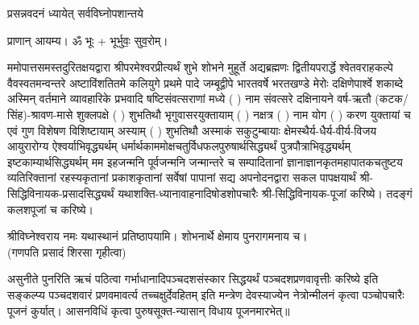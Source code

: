 
\setlength{\parindent}{0pt}




{प्रसन्नवदनं ध्यायेत् सर्वविघ्नोपशान्तये}

प्राणान्  आयम्य।  ॐ भूः + भूर्भुवः॒ सुव॒रोम्।


ममोपात्तसमस्तदुरितक्षयद्वारा श्रीपरमेश्वरप्रीत्यर्थं शुभे शोभने मुहूर्ते अद्यब्रह्मणः
द्वितीयपरार्द्धे श्वेतवराहकल्पे वैवस्वतमन्वन्तरे अष्टाविंशतितमे कलियुगे प्रथमे पादे
जम्बूद्वीपे भारतवर्षे भरतखण्डे मेरोः दक्षिणेपार्श्वे शकाब्दे अस्मिन् वर्तमाने व्यावहारिके
प्रभवादि षष्टिसंवत्सराणां मध्ये (  ) नाम संवत्सरे दक्षिनायने 
वर्ष-ऋतौ (कटक/सिंह)-श्रावण-मासे शुक्लपक्षे ( ) शुभतिथौ भृगुवासरयुक्तायाम्
(  ) नक्षत्र (  ) नाम  योग  ( ) करण युक्तायां च एवं गुण विशेषण विशिष्टायाम्
अस्याम् ( ) शुभतिथौ 
अस्माकं सकुटुम्बायाः क्षेमस्थैर्य-धैर्य-वीर्य-विजय आयुरारोग्य ऐश्वर्याभिवृद्ध्यर्थम्
धर्मार्थकाममोक्ष\-चतुर्विधफलपुरुषार्थसिद्ध्यर्थं पुत्रपौत्राभि\-वृद्ध्यर्थम् इष्टकाम्यार्थसिद्ध्यर्थम्
मम इहजन्मनि पूर्वजन्मनि जन्मान्तरे च सम्पादितानां ज्ञानाज्ञानकृतमहा\-पातकचतुष्टय
व्यतिरिक्तानां रहस्यकृतानां प्रकाशकृतानां सर्वेषां पापानां सद्य अपनोदनद्वारा सकल 
पापक्षयार्थं श्री-सिद्धिविनायक-प्रसादसिद्ध्यर्थं 
यथाशक्ति-ध्यानावाहनादिषोडशोपचारैः श्री-सिद्धिविनायक-पूजां करिष्ये। तदङ्गं कलशपूजां च करिष्ये। 

श्रीविघ्नेश्वराय नमः यथास्थानं प्रतिष्ठापयामि। शोभनार्थे क्षेमाय पुनरागमनाय च।\\
(गणपति प्रसादं शिरसा गृहीत्वा)














असुनीते पुनरिति ऋचं पठित्वा गर्भाधानादिपञ्चदशसंस्कार सिद्धयर्थं पञ्चदशप्रणवावृत्तीः करिष्ये इति सङ्कल्प्य पञ्चदशवारं प्रणवमावर्त्य तच्चक्षुर्देवहितम् इति मन्त्रेण देवस्याज्येन नेत्रोन्मीलनं कृत्वा पञ्चोपचारैः पूजनं कुर्यात्। 
आसनविधिं कृत्वा पुरुषसूक्त-न्यासान् विधाय पूजनमारभेत्॥ 

